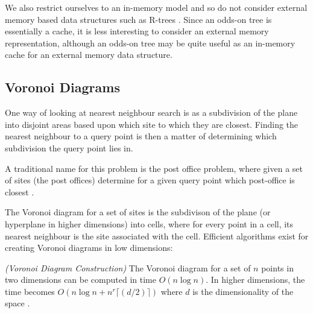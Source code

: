 \documentclass[mcs]{scsthesis}
\begin{document}
We also restrict ourselves to an in-memory model and so do not consider
external memory based data structures such as R-trees \cite{rtree}. Since an
odds-on tree is essentially a cache, it is less interesting to consider an
external memory representation, although an odds-on tree may be quite useful
as an in-memory cache for an external memory data structure.

\subsection{Voronoi Diagrams}

One way of looking at nearest neighbour search is as a subdivision of the plane
into disjoint areas based upon which site to which they are closest. Finding
the nearest neighbour to a query point is then a matter of determining which
subdivision the query point lies in.

A traditional name for this problem is the post office problem, where given a
set of sites (the post offices) determine for a given query point which
post-office is closest \cite{dutch}.

The Voronoi diagram for a set of sites is the subdivison of the plane (or
hyperplane in higher dimensions) into cells, where for every point in a cell,
its nearest neighbour is the site associated with the cell. Efficient algorithms
exist for creating Voronoi diagrams in low dimensions:

\begin{thm} \emph{(Voronoi Diagram Construction)}
The Voronoi diagram for a set of $n$ points in two dimensions can be computed
in time \(O(n \log n)\). In higher dimensions, the time becomes
\(O(n \log n + n^r{\lceil(d/2)\rceil})\) where $d$ is the dimensionality of the
space \cite{dutch}.
\end{thm}
\end{document}
